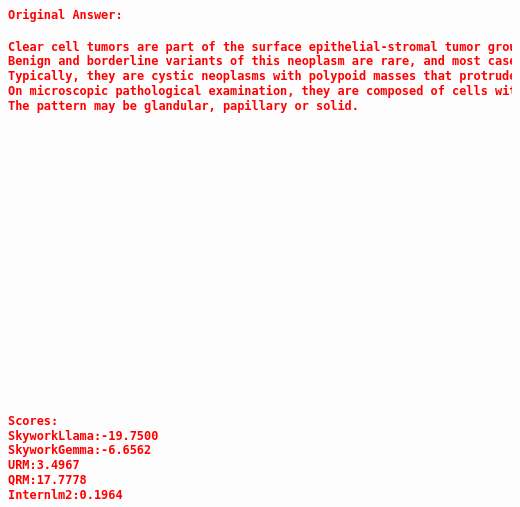 \begin{lstlisting}[language=json,numbers=none]
Original Answer:

Clear cell tumors are part of the surface epithelial-stromal tumor group of Ovarian cancers, accounting for 6% of these neoplastic cases. Clear cell tumors are also associated with the pancreas and salivary glands.
Benign and borderline variants of this neoplasm are rare, and most cases are malignant.
Typically, they are cystic neoplasms with polypoid masses that protrude into the cyst.
On microscopic pathological examination, they are composed of cells with clear cytoplasm (that contains glycogen) and hob nail cells (from which the glycogen has been secreted).
The pattern may be glandular, papillary or solid.


















Scores:
SkyworkLlama:-19.7500
SkyworkGemma:-6.6562
URM:3.4967
QRM:17.7778
Internlm2:0.1964
\end{lstlisting}